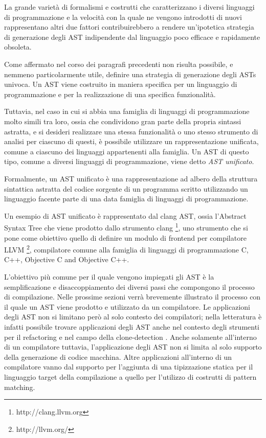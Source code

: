 La grande varietà di formalismi e costrutti che caratterizzano i diversi
linguaggi di programmazione e la velocità con la quale ne vengono introdotti di
nuovi rappresentano altri due fattori contribuirebbero a rendere un'ipotetica
strategia di generazione degli AST indipendente dal linguaggio poco efficace e
rapidamente obsoleta.

Come affermato nel corso dei paragrafi precedenti non risulta possibile, e
nemmeno particolarmente utile, definire una strategia di generazione degli ASTs
univoca. Un AST viene costruito in maniera specifica per un linguaggio di
programmazione e per la realizzazione di una specifica funzionalità.

Tuttavia, nel caso in cui si abbia una famiglia di linguaggi di programmazione
molto simili tra loro, ossia che condividono gran parte della propria sintassi
astratta, e si desideri realizzare una stessa funzionalità o uno stesso
strumento di analisi per ciascuno di questi, è possibile utilizzare un
rappresentazione unificata, comune a ciascuno dei linguaggi appartenenti alla
famiglia. Un AST di questo tipo, comune a diversi linguaggi di programmazione,
viene detto \textit{AST unificato}.

Formalmente, un AST unificato è una rappresentazione ad albero della struttura
sintattica astratta del codice sorgente di un programma scritto utilizzando un
linguaggio facente parte di una data famiglia di linguaggi di programmazione.

Un esempio di AST unificato è rappresentato dal clang AST, ossia l’Abstract
Syntax Tree che viene prodotto dallo strumento clang \footnote
{http://clang.llvm.org}, uno strumento che si pone come obiettivo quello di
definire un modulo di frontend per compilatore LLVM \footnote{http://llvm.org/},
compilatore comune alla famiglia di linguaggi di programmazione C, C++,
Objective C and Objective C++. \cite{DBLP:conf/lcpc/LattnerA04}

L’obiettivo più comune per il quale vengono impiegati gli AST è la
semplificazione e disaccoppiamento dei diversi passi che compongono il processo
di compilazione. Nelle prossime sezioni verrà brevemente illustrato il processo
con il quale un AST viene prodotto e utilizzato da un compilatore. Le
applicazioni degli AST non si limitano però al solo contesto dei compilatori;
nella letteratura è infatti possibile trovare applicazioni degli AST anche nel
contesto degli strumenti per il refactoring \cite{jscodeshift2016} e nel campo
della clone-detection \cite{DBLP:conf/saci/LazarB14}. Anche solamente
all’interno di un compilatore tuttavia, l’applicazione degli AST non si limita
al solo supporto della generazione di codice macchina. Altre applicazioni
all’interno di un compilatore vanno dal supporto per l'aggiunta di una
tipizzazione statica per il linguaggio target della compilazione a quello per
l'utilizzo di costrutti di pattern matching.

